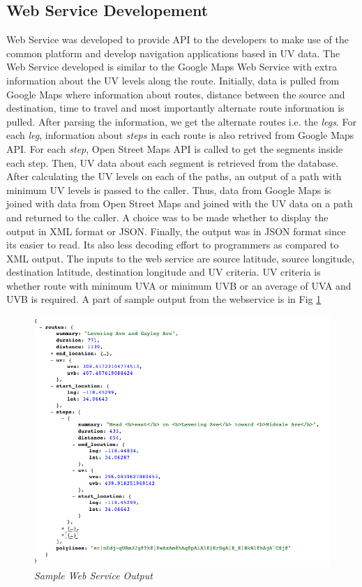 \documentclass[10pt]{sigplan-proc-varsize}
\begin{document}
\subsection{Web Service Developement}
Web Service was developed to provide API to the developers to make use of the common platform and develop navigation applications based in UV data. The Web Service developed is similar to the Google Maps Web Service \cite{googleWebService} with extra information about the UV levels along the route. Initially, data is pulled from Google Maps where information about routes, distance between the source and destination, time to travel and most importantly alternate route information is pulled. After parsing the information, we get the alternate routes i.e. the {\it legs}. For each {\it leg}, information about {\it steps} in each route is also retrived from Google Maps API. For each {\it step}, Open Street Maps API is called to get the segments inside each step. Then, UV data about each segment is retrieved from the database. After calculating the UV levels on each of the paths, an output of a path with minimum UV levels is passed to the caller. Thus, data from Google Maps is joined with data from Open Street Maps and joined with the UV data on a path and returned to the caller. A choice was to be made whether to display the output in XML format or JSON. Finally, the output was in JSON format since its easier to read. Its also less decoding effort to programmers as compared to XML output. The inputs to the web service are source latitude, source longitude, destination latitude, destination longitude and UV criteria. UV criteria is whether route with minimum UVA or minimum UVB or an average of UVA and UVB is required. A part of sample output from the webservice is in Fig \ref{fig:webServiceOutput}
\begin{figure}
\begin{center}
\includegraphics[scale=0.35]{webServiceOutput.png}
\caption{\small \sl Sample Web Service Output}
\label{fig:webServiceOutput}
\end{center}
\end{figure}
\end{document}
